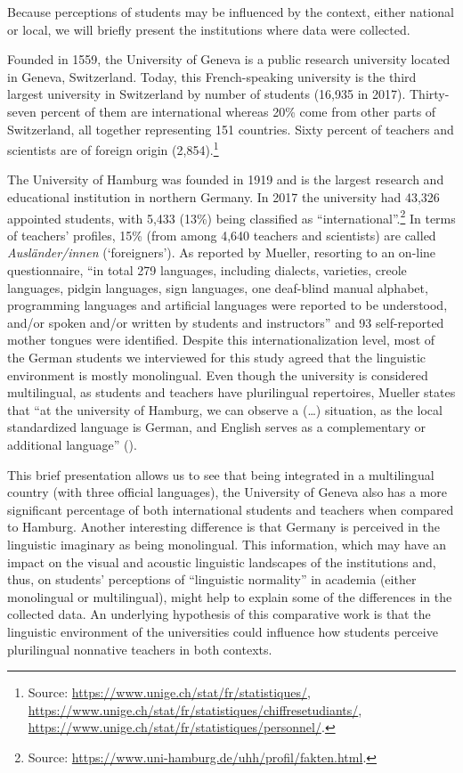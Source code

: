 \documentclass[output=paper]{../langscibook}
\begin{document}
Because perceptions of students may be influenced by the context, either national or local, we will briefly present the institutions where data were collected. 

Founded in 1559, the University of Geneva is a public research university located in Geneva, Switzerland. Today, this French-speaking university is the third largest university in Switzerland by number of students (16,935 in 2017). Thirty-seven percent of them are international whereas 20\% come from other parts of Switzerland, all together representing 151 countries. Sixty percent of teachers and scientists are of foreign origin (2,854).\footnote{Source: \url{https://www.unige.ch/stat/fr/statistiques/}, \url{https://www.unige.ch/stat/fr/statistiques/chiffresetudiants/}, \url{https://www.unige.ch/stat/fr/statistiques/personnel/}.}

The University of Hamburg was founded in 1919 and is the largest research and educational institution in northern Germany. In 2017 the university had 43,326 appointed students, with 5,433 (13\%) being classified as “international”.\footnote{Source: \url{https://www.uni-hamburg.de/uhh/profil/fakten.html}.}  In terms of teachers’ profiles, 15\% (from among 4,640 teachers and scientists) are called \emph{Ausländer/innen} (`foreigners'). As reported by Mueller, resorting to an on-line questionnaire, “in total 279 languages, including dialects, varieties, creole languages, pidgin languages, sign languages, one deaf-blind manual alphabet, programming languages and artificial languages were reported to be understood, and/or spoken and/or written by students and instructors” \citep[366]{Mueller2018} and 93 self-reported mother tongues were identified. Despite this internationalization level, most of the German students we interviewed for this study agreed that the linguistic environment is mostly monolingual. Even though the university is considered multilingual, as students and teachers have plurilingual repertoires, Mueller states that “at the university of Hamburg, we can observe a (…) situation, as the local standardized language is German, and English serves as a complementary or additional language” (\citeyear[361]{Mueller2018}).

This brief presentation allows us to see that being integrated in a multilingual country (with three official languages), the University of Geneva also has a more significant percentage of both international students and teachers when compared to Hamburg. Another interesting difference is that Germany is perceived in the linguistic imaginary as being monolingual. This information, which may have an impact on the visual and acoustic linguistic landscapes of the institutions and, thus, on students’ perceptions of “linguistic normality” in academia (either monolingual or multilingual), might help to explain some of the differences in the collected data. An underlying hypothesis of this comparative work is that the linguistic environment of the universities could influence how students perceive plurilingual nonnative teachers in both contexts. 
\end{document}

